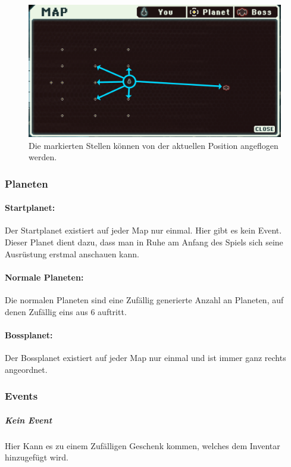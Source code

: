\documentclass[fontsize=12pt,paper=a4,twoside]{scrartcl}
\begin{document}
\begin{figure}[H]
\centering
\includegraphics[width=0.8\linewidth]{DasSpiel/Karte/wohinReisen.png}
\caption{Die markierten Stellen können von der aktuellen Position angeflogen werden.}
\end{figure} 




\subsubsection{Planeten}

\paragraph{Startplanet: }
Der Startplanet existiert auf jeder Map nur einmal. Hier gibt es kein Event. Dieser Planet dient dazu, dass man in Ruhe am Anfang des Spiels sich seine Ausrüstung erstmal anschauen kann. 

\paragraph{Normale Planeten: }
Die normalen Planeten sind eine Zufällig generierte Anzahl an Planeten, auf denen Zufällig eins aus 6  auftritt.

\paragraph{Bossplanet: }
Der Bossplanet existiert auf jeder Map nur einmal und ist immer ganz rechts angeordnet. 


\subsubsection{Events}
\label{sec:Events}

\subparagraph{Kein Event} Hier Kann es zu einem Zufälligen Geschenk kommen, welches dem Inventar hinzugefügt wird.
\end{document}
